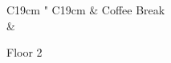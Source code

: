 \documentclass{article}
\begin{document}


\vspace{4cm}

\begin{vsltext}{2.9cm}{3.5cm}
\begin{center}
    \begin{tabular}{ C{19cm} " C{19cm} }
         & Coffee Break \\
                                     & \Coffee{4cm} \\
\end{tabular}

\vspace{3cm}

Floor 2
\end{center}
\end{vsltext}
\end{document}
